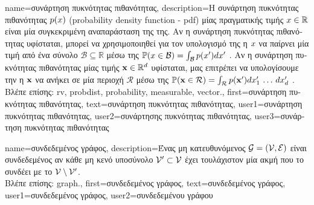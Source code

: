 {name={\foreignlanguage{greek}{συνάρτηση πυκνότητας πιθανότητας}},
	description={\foreignlanguage{greek}{Η συνάρτηση πυκνότητας πιθανότητας} 
		$p(x)$ (probability density function - pdf) \foreignlanguage{greek}{μίας}  \foreignlanguage{greek}{πραγματικής τιμής 
		$x \in \mathbb{R}$ είναι μία συγκεκριμένη αναπαράσταση της}  \foreignlanguage{greek}{της. 
		Αν η συνάρτηση πυκνότητας πιθανότητας υφίσταται, μπορεί να χρησιμοποιηθεί για τον υπολογισμό της}  
		\foreignlanguage{greek}{η $x$ να παίρνει μία τιμή από ένα}  \foreignlanguage{greek}{σύνολο  
		$\mathcal{B} \subseteq \mathbb{R}$ μέσω της} $\mathbb{P}({x \in \mathcal{B}}) = \int_{\mathcal{B}} p(x') d x'$ 
		\cite[\foreignlanguage{greek}{Κεφ.} 3]{BertsekasProb}. \foreignlanguage{greek}{Αν η συνάρτηση πυκνότητας πιθανότητας μίας} 
		  \foreignlanguage{greek}{τιμής ${\bf x} \in \mathbb{R}^{d}$ υφίσταται, μας επιτρέπει 
		να υπολογίσουμε την}  \foreignlanguage{greek}{η ${\bf x}$ να ανήκει σε μία}  
		\foreignlanguage{greek}{περιοχή $\mathcal{R}$ μέσω της} 
		$\mathbb{P}({{\bf x} \in \mathcal{R}}) = \int_{\mathcal{R}} p({\bf x}') d x_{1}' \,\ldots \,d x_{d}' $ 
		\cite[\foreignlanguage{greek}{Κεφ.} 3]{BertsekasProb}.\\
        		\foreignlanguage{greek}{Βλέπε επίσης:} \gls{rv}, \gls{probdist}, \gls{probability}, \gls{measurable}, \gls{vector}.},
	first={\foreignlanguage{greek}{συνάρτηση πυκνότητας πιθανότητας}},
	text={\foreignlanguage{greek}{συνάρτηση πυκνότητας πιθανότητας}},
	user1={\foreignlanguage{greek}{συνάρτηση πυκνότητας πιθανότητας}}, %
	user2={\foreignlanguage{greek}{συνάρτησης πυκνότητας πιθανότητας}}, %
	user3={\foreignlanguage{greek}{συνάρτηση πυκνότητας πιθανότητας}} %
}

{name={\foreignlanguage{greek}{συνδεδεμένος γράφος}}, 
	description={\foreignlanguage{greek}{Ένας μη κατευθυνόμενος} 
		 $\mathcal{G}=\left( \mathcal{V},\mathcal{E} \right)$ \foreignlanguage{greek}{είναι συνδεδεμένος αν κάθε μη κενό υποσύνολο  
		$\mathcal{V}' \subset \mathcal{V}$ έχει τουλάχιστον μία ακμή που το συνδέει με το} $\mathcal{V} \setminus \mathcal{V}'$.\\
		\foreignlanguage{greek}{Βλέπε επίσης:} \gls{graph}.}, 
	first={\foreignlanguage{greek}{συνδεδεμένος γράφος}},
	text={\foreignlanguage{greek}{συνδεδεμένος γράφος}},
	user1={\foreignlanguage{greek}{συνδεδεμένος γράφος}}, %
	user2={\foreignlanguage{greek}{συνδεδεμένου γράφου}} %
}


